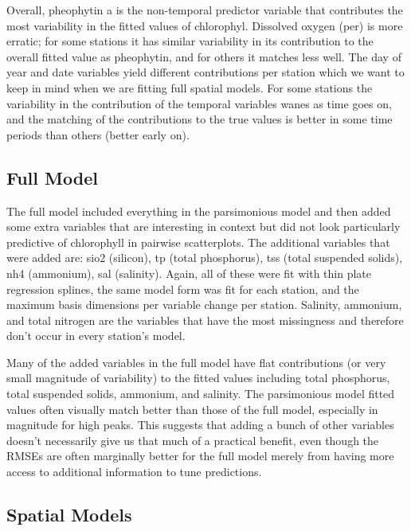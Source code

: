\documentclass[12pt]{amsart}
\begin{document}

Overall, pheophytin a is the non-temporal predictor variable that contributes the most variability in the fitted values of chlorophyl. Dissolved oxygen (per) is more erratic; for some stations it has similar variability in its contribution to the overall fitted value as pheophytin, and for others it matches less well. The day of year and date variables yield different contributions per station which we want to keep in mind when we are fitting full spatial models. For some stations the variability in the contribution of the temporal variables wanes as time goes on, and the matching of the contributions to the true values is better in some time periods than others (better early on). 

\subsection{Full Model}

The full model included everything in the parsimonious model and then added some extra variables that are interesting in context but did not look particularly predictive of chlorophyll in pairwise scatterplots. The additional variables that were added are: sio2 (silicon), tp (total phosphorus), tss (total suspended solids), nh4 (ammonium), sal (salinity). Again, all of these were fit with thin plate regression splines, the same model form was fit for each station, and the maximum basis dimensions per variable change per station.  Salinity, ammonium, and total nitrogen are the variables that have the most missingness and therefore don't occur in every station's model.


Many of the added variables in the full model have flat contributions (or very small magnitude of variability) to the fitted values including total phosphorus, total suspended solids, ammonium, and salinity. The parsimonious model fitted values often visually match better than those of the full model, especially in magnitude for high peaks. This suggests that adding a bunch of other variables doesn't necessarily give us that much of a practical benefit, even though the RMSEs are often marginally better for the full model merely from having more access to additional information to tune predictions.



\subsection{Spatial Models}
\end{document}
